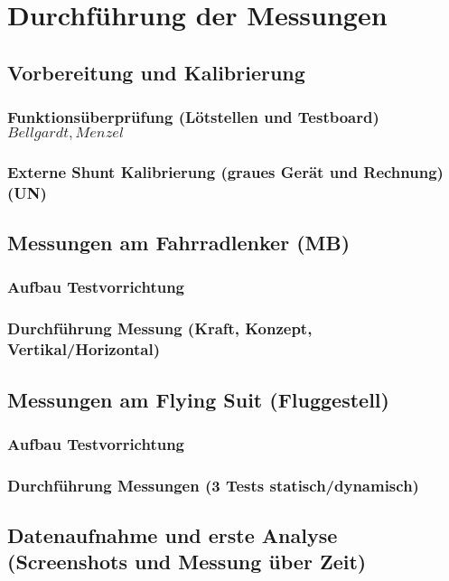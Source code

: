 \chapter{Durchf\"uhrung der Messungen}

\section{Vorbereitung und Kalibrierung}
\subsection{Funktions\"uberpr\"ufung (L\"otstellen und Testboard) \(Bellgardt, Menzel\)}


\subsection{Externe Shunt Kalibrierung (graues Ger\"at und Rechnung) (UN)}

\section{Messungen am Fahrradlenker (MB)}
\subsection{Aufbau Testvorrichtung}
\subsection{Durchf\"uhrung Messung (Kraft, Konzept, Vertikal/Horizontal)}

\section{Messungen am Flying Suit (Fluggestell)}
\subsection{Aufbau Testvorrichtung}
\subsection{Durchf\"uhrung Messungen (3 Tests statisch/dynamisch)}

\section{Datenaufnahme und erste Analyse (Screenshots und Messung \"uber Zeit)}
